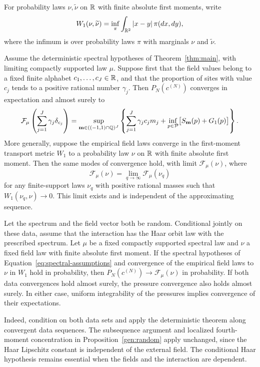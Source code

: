 For probability laws $\nu,\widetilde\nu$ on $\mathbb R$ with finite absolute
first moments, write
\[
 W_1(\nu,\widetilde\nu)
   =\inf_{\pi}\int_{\mathbb R^2}|x-y|\,\pi(dx,dy),
\]
where the infimum is over probability laws $\pi$ with marginals $\nu$
and $\widetilde\nu$.

\begin{theorem}\label{mag:theorem}
Assume the deterministic spectral hypotheses of Theorem~\ref{thm:main},
with limiting compactly supported law $\mu$. Suppose first that the field
values belong to a fixed finite alphabet $c_1,\ldots,c_J\in\mathbb R$, and that
the proportion of sites with value $c_j$ tends to a positive rational
number $\gamma_j$. Then $P_N(c^{(N)})$ converges in expectation and almost
surely to
\begin{equation}\label{mag:finite-formula}
 \mathcal F_\mu\left(\sum_{j=1}^J\gamma_j\delta_{c_j}\right)
 =\sup_{\mathbf m\in((-1,1)\cap\mathbb Q)^J}
   \left\{\sum_{j=1}^J\gamma_jc_jm_j
    +\inf_{p\in\mathcal P}\bigl[S_{\mathbf m}(p)+G_1(p)\bigr]\right\}.
\end{equation}
More generally, suppose the empirical field laws converge in the
first-moment transport metric $W_1$ to a probability law $\nu$ on $\mathbb R$
with finite absolute first moment. Then the same modes of convergence
hold, with limit $\mathcal F_\mu(\nu)$, where
\begin{equation}\label{mag:W1-formula}
 \mathcal F_\mu(\nu)
   =\lim_{q\to\infty}\mathcal F_\mu(\nu_q)
\end{equation}
for any finite-support laws $\nu_q$ with positive rational masses such
that $W_1(\nu_q,\nu)\to0$. This limit exists and is independent of the
approximating sequence.
\end{theorem}

\begin{remark}
\label{mag:random-data}
Let the spectrum and the field vector both be random. Conditional jointly
on these data, assume that the interaction has the Haar orbit law with
the prescribed spectrum. Let $\mu$ be a fixed compactly supported
spectral law and $\nu$ a fixed field law with finite absolute first
moment. If the spectral hypotheses of
Equation~\eqref{eq:spectral-assumptions} and convergence of the empirical
field laws to $\nu$ in $W_1$ hold in probability, then
$P_N(c^{(N)})\to\mathcal F_\mu(\nu)$ in probability. If both data
convergences hold almost surely, the pressure convergence also holds
almost surely. In either case, uniform integrability of the pressures
implies convergence of their expectations.

Indeed, condition on both data sets and apply the deterministic theorem
along convergent data sequences. The subsequence argument and localized
fourth-moment concentration in Proposition~\ref{gen:random} apply
unchanged, since the Haar Lipschitz constant is independent of the
external field. The conditional Haar hypothesis remains essential when
the fields and the interaction are dependent.
\end{remark}

